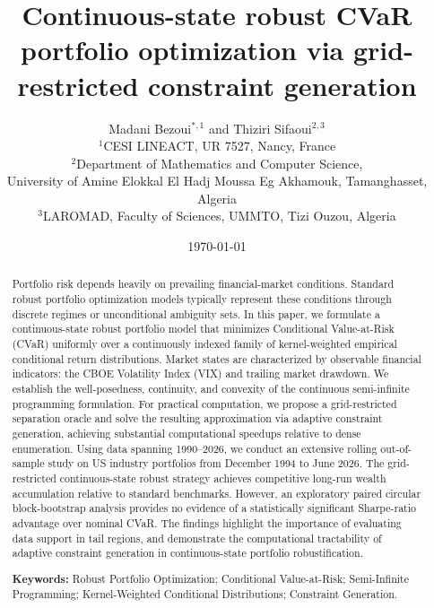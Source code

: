 \documentclass[11pt, a4paper]{article}
\title{Continuous-state robust CVaR portfolio optimization via grid-restricted constraint generation}
\author{
Madani Bezoui$^{*,1}$ and Thiziri Sifaoui$^{2,3}$ \\
\small $^1$CESI LINEACT, UR 7527, Nancy, France \\
\small $^2$Department of Mathematics and Computer Science, \\ \small University of Amine Elokkal El Hadj Moussa Eg Akhamouk, Tamanghasset, Algeria \\
\small $^3$LAROMAD, Faculty of Sciences, UMMTO, Tizi Ouzou, Algeria
}
\date{\today}
\begin{document}
\maketitle
\begin{NoHyper}\def\thefootnote{}\end{NoHyper}

\begin{abstract}
Portfolio risk depends heavily on prevailing financial-market conditions. Standard robust portfolio optimization models typically represent these conditions through discrete regimes or unconditional ambiguity sets. In this paper, we formulate a continuous-state robust portfolio model that minimizes Conditional Value-at-Risk (CVaR) uniformly over a continuously indexed family of kernel-weighted empirical conditional return distributions. Market states are characterized by observable financial indicators: the CBOE Volatility Index (VIX) and trailing market drawdown. We establish the well-posedness, continuity, and convexity of the continuous semi-infinite programming formulation. For practical computation, we propose a grid-restricted separation oracle and solve the resulting approximation via adaptive constraint generation, achieving substantial computational speedups relative to dense enumeration. Using data spanning 1990--2026, we conduct an extensive rolling out-of-sample study on US industry portfolios from December 1994 to June 2026. The grid-restricted continuous-state robust strategy achieves competitive long-run wealth accumulation relative to standard benchmarks. However, an exploratory paired circular block-bootstrap analysis provides no evidence of a statistically significant Sharpe-ratio advantage over nominal CVaR. The findings highlight the importance of evaluating data support in tail regions, and demonstrate the computational tractability of adaptive constraint generation in continuous-state portfolio robustification.

\textbf{Keywords:} Robust Portfolio Optimization; Conditional Value-at-Risk; Semi-Infinite Programming; Kernel-Weighted Conditional Distributions; Constraint Generation.
\end{abstract}

\newpage
\end{document}
